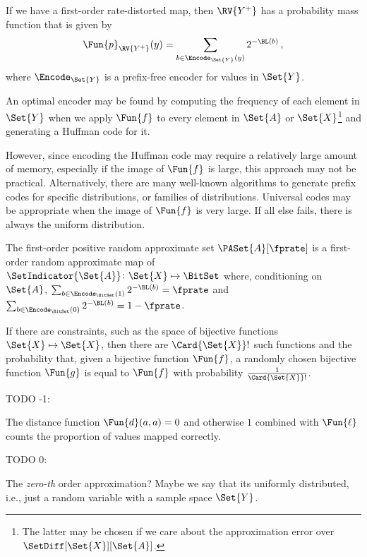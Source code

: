 \documentclass[ ../main.tex]{subfiles}
\begin{document}
If we have a first-order rate-distorted map, then $\RV{Y^{+}}$ has a probability mass function that is given by
\begin{equation}
	\Fun{p}_{\RV{Y^{+}}}(y) = \sum_{b \in \Encode_{\Set{Y}}(y)} 2^{-\BL(b)}\,,
\end{equation}
where $\Encode_{\Set{Y}}$ is a prefix-free encoder for values in $\Set{Y}$.

An optimal encoder may be found by computing the frequency of each element in $\Set{Y}$ when we apply $\Fun{f}$ to every element in $\Set{A}$ or $\Set{X}$\footnote{The latter may be chosen if we care about the approximation error over $\SetDiff[\Set{X}][\Set{A}]$.} and generating a Huffman code for it.

However, since encoding the Huffman code may require a relatively large amount of memory, especially if the image of $\Fun{f}$ is large, this approach may not be practical.
Alternatively, there are many well-known algorithms to generate prefix codes for specific distributions, or families of distributions.
Universal codes may be appropriate when the image of $\Fun{f}$ is very large.
If all else fails, there is always the uniform distribution.

\begin{example}
The first-order positive random approximate set $\PASet{A}[\fprate]$ is a first-order random approximate map of $\SetIndicator{\Set{A}} \colon \Set{X} \mapsto \BitSet$ where, conditioning on $\Set{A}$, $\sum_{b \in \Encode_{\BitSet}(1)} 2^{-\BL(b)} = \fprate$ and $\sum_{b \in \Encode_{\BitSet}(0)} 2^{-\BL(b)} = 1-\fprate$.
\end{example}



If there are constraints, such as the space of bijective functions $\Set{X} \mapsto \Set{X}$, then there are $\Card{\Set{X}}!$ such functions and the probability that, given a bijective function $\Fun{f}$, a randomly chosen bijective function $\Fun{g}$ is equal to $\Fun{f}$ with probability $\frac{1}{\Card{\Set{X}}!}$.




TODO -1:

The distance function $\Fun{d}(a,a) = 0$ and otherwise $1$ combined with $\Fun{\ell}$ counts the proportion of values mapped correctly.

TODO 0:

The \emph{zero-th} order approximation? Maybe we say that its uniformly distributed, i.e., just a random variable with a sample space $\Set{Y}$.
\end{document}
